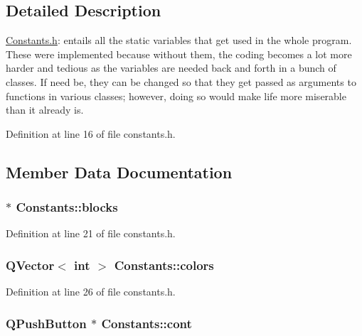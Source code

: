 \subsection{Detailed Description}
\hyperlink{constants_8h}{Constants.h}: entails all the static variables that get used in the whole program. These were implemented because without them, the coding becomes a lot more harder and tedious as the variables are needed back and forth in a bunch of classes. If need be, they can be changed so that they get passed as arguments to functions in various classes; however, doing so would make life more miserable than it already is. 

Definition at line 16 of file constants.h.

\subsection{Member Data Documentation}
\hypertarget{class_constants_a0e4afb47e79ae40e095d3ab4ef111727}{
\subsubsection[{blocks}]{ $\ast$ {\bf Constants::blocks}}}
\label{class_constants_a0e4afb47e79ae40e095d3ab4ef111727}


Definition at line 21 of file constants.h.\hypertarget{class_constants_ab41b19d22c19c87736fe7fce43e4b54a}{
\subsubsection[{colors}]{\setlength{\rightskip}{0pt plus 5cm}QVector$<$ int $>$ {\bf Constants::colors}}}
\label{class_constants_ab41b19d22c19c87736fe7fce43e4b54a}


Definition at line 26 of file constants.h.\hypertarget{class_constants_a8f49de0072adb2398a2f7c76eac4716b}{
\subsubsection[{cont}]{\setlength{\rightskip}{0pt plus 5cm}QPushButton $\ast$ {\bf Constants::cont}}}
\label{class_constants_a8f49de0072adb2398a2f7c76eac4716b}



